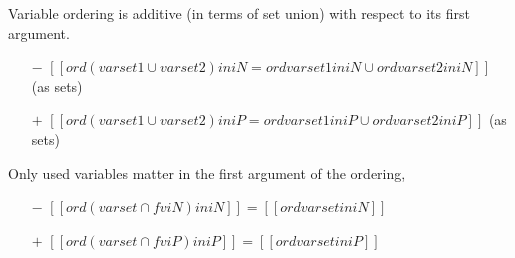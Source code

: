\begin{corollary}
  \label{corollary:ord-additivity}
  Variable ordering is additive (in terms of set union) with respect to its first argument.
  \begin{itemize}
    \item[$-$] $[[ {ord (varset1 ∪ varset2) in iN} 
                = 
                {ord varset1 in iN} ∪ {ord varset2 in iN}]]$ (as sets)
    \item[$+$] $[[{ord (varset1 ∪ varset2) in iP}
                =
                {ord varset1 in iP} ∪ {ord varset2 in iP}]]$ (as sets)

  \end{itemize}
\end{corollary}

\begin{lemma}
  \label{corollary:ord-weakening}
  Only used variables matter in the first argument of the ordering,
  \begin{itemize}
    \item[$-$] $[[ ord (varset ∩ fv iN) in iN ]] = [[ ord varset in iN ]]$
    \item[$+$] $[[ ord (varset ∩ fv iP) in iP ]] = [[ ord varset in iP ]]$
  \end{itemize}
\end{lemma}
